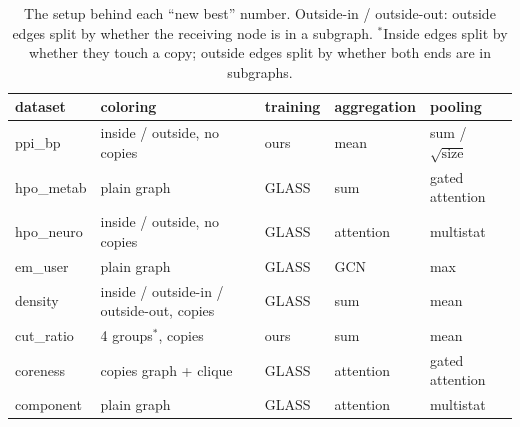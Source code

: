 \documentclass[11pt]{article}
\begin{document}
\begin{table}[H]
\centering
\begin{tabular}{lllll}
\toprule
dataset & coloring & training & aggregation & pooling \\
\midrule
ppi\_bp    & inside / outside, no copies & ours  & mean      & sum / $\sqrt{\text{size}}$ \\
hpo\_metab & plain graph                 & GLASS & sum       & gated attention \\
hpo\_neuro & inside / outside, no copies & GLASS & attention & multistat \\
em\_user   & plain graph                 & GLASS & GCN       & max \\
density    & inside / outside-in / outside-out, copies & GLASS & sum & mean \\
cut\_ratio & 4 groups$^*$, copies & ours & sum & mean \\
coreness   & copies graph + clique       & GLASS & attention & gated attention \\
component  & plain graph                 & GLASS & attention & multistat \\
\bottomrule
\end{tabular}
\caption{The setup behind each ``new best'' number. Outside-in / outside-out: outside edges split by
whether the receiving node is in a subgraph. $^*$Inside edges split by whether they touch a copy;
outside edges split by whether both ends are in subgraphs.}
\end{table}
\end{document}
